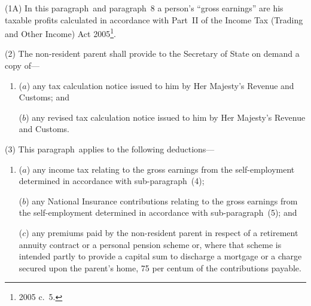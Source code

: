 \documentclass[12pt,a4paper]{article}
\begin{document}
(1A) In this paragraph~and paragraph~8 a person’s “gross earnings” are his taxable profits calculated in accordance with Part~II of the Income Tax (Trading and Other Income) Act 2005\footnote{2005 c.\ 5.}.


(2) The non-resident parent shall provide to the Secretary of State on demand a copy of—
\begin{enumerate}\item[]
($a$) any tax calculation notice issued to him by Her Majesty’s Revenue and Customs; and

($b$) any revised tax calculation notice issued to him by Her Majesty’s Revenue and Customs.
\end{enumerate}

(3) This paragraph~applies to the following deductions—
\begin{enumerate}\item[]
($a$) any income tax relating to the gross earnings from the self-employment determined in accordance with sub-paragraph~(4);

($b$) any National Insurance contributions relating to the gross earnings from the self-employment determined in accordance with sub-paragraph~(5); and

($c$) any premiums paid by the non-resident parent in respect of a retirement annuity contract or a personal pension scheme or, where that scheme is intended partly to provide a capital sum to discharge a mortgage or a charge secured upon the parent’s home, 75 per centum of the contributions payable.
\end{enumerate}
\end{document}
